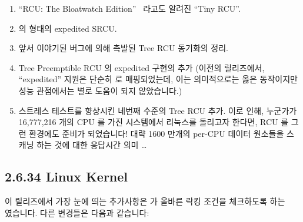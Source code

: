 \begin{enumerate}
\item	``RCU: The Bloatwatch
	Edition''~\cite{PaulEMcKenney2009LWNBloatWatchRCU} 라고도 알려진 ``Tiny
	RCU''.
\item	{} 의 형태의 expedited SRCU.
\item	앞서 이야기된 버그에 의해 촉발된 Tree RCU 동기화의 정리.
\item	Tree Preemptible RCU 의 expedited 구현의 추가 (이전의 릴리즈에서,
	``expedited'' 지원은 단순히  로 매핑되었는데,
	이는 의미적으로는 옳은 동작이지만 성능 관점에서는 별로 도움이 되지
	않았습니다.)
\item	스트레스 테스트를 향상시킨 네번째 수준의 Tree RCU 추가.
	이로 인해, 누군가가 16,777,216 개의 CPU 를 가진 시스템에서 리눅스를
	돌리고자 한다면, RCU 를 그런 환경에도 준비가 되었습니다!
	대략 1600 만개의 per-CPU 데이터 원소들을 스캐닝 하는 것에 대한 응답시간
	의미 \ldots

\end{enumerate}

\subsection{2.6.34 Linux Kernel}

이 릴리즈에서 가장 눈에 띄는 추가사항은  가 올바른 락킹
조건을 체크하도록 하는 ~\cite{PaulEMcKenney2010LockdepRCU}
였습니다.
다른 변경들은 다음과 같습니다:
\iffalse

